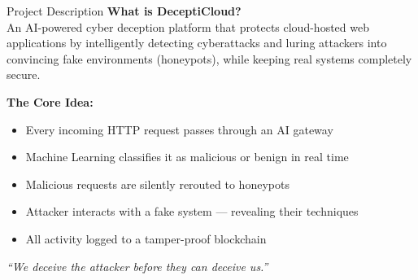 \documentclass[aspectratio=169,12pt]{beamer}
\begin{document}
\begin{frame}{Project Description}
  \textbf{\textcolor{dcCyan}{What is DeceptiCloud?}}\\[0.3em]
  An AI-powered cyber deception platform that protects cloud-hosted web applications
  by intelligently detecting cyberattacks and luring attackers into convincing fake
  environments (honeypots), while keeping real systems completely secure.

  \vspace{0.5em}
  \textbf{\textcolor{dcCyan}{The Core Idea:}}
  \begin{itemize}
    \item Every incoming HTTP request passes through an AI gateway
    \item Machine Learning classifies it as \textcolor{dcRed}{malicious} or \textcolor{dcGreen}{benign} in real time
    \item Malicious requests are silently rerouted to \textcolor{dcYellow}{honeypots}
    \item Attacker interacts with a fake system --- revealing their techniques
    \item All activity logged to a \textcolor{dcPurple}{tamper-proof blockchain}
  \end{itemize}

  \vspace{0.4em}
  \begin{block}{}
    \centering\textit{``We deceive the attacker before they can deceive us.''}
  \end{block}
\end{frame}
\end{document}
